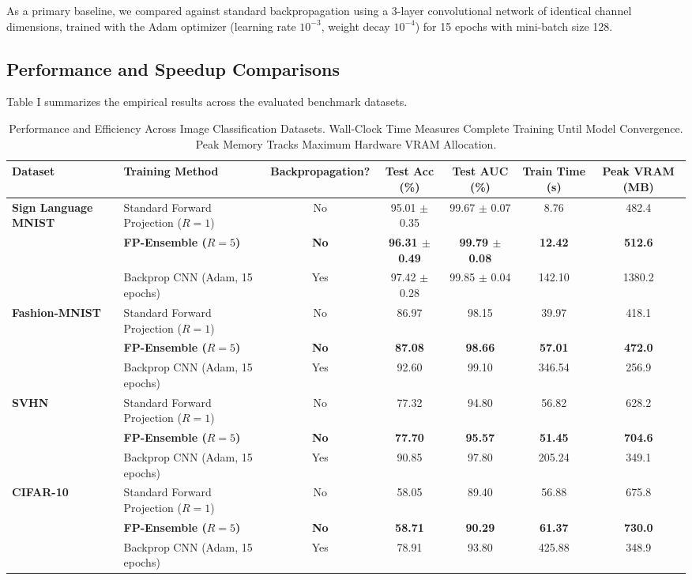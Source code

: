 \documentclass[journal]{IEEEtran}
\begin{document}
As a primary baseline, we compared against standard backpropagation using a 3-layer convolutional network of identical channel dimensions, trained with the Adam optimizer (learning rate $10^{-3}$, weight decay $10^{-4}$) for 15 epochs with mini-batch size 128.

\subsection{Performance and Speedup Comparisons}

Table I summarizes the empirical results across the evaluated benchmark datasets.

\begin{table}[t]
\centering
\caption{Performance and Efficiency Across Image Classification Datasets. Wall-Clock Time Measures Complete Training Until Model Convergence. Peak Memory Tracks Maximum Hardware VRAM Allocation.}
\label{tab:main_results}
\begin{tabular}{llccccc}
\toprule
\textbf{Dataset} & \textbf{Training Method} & \textbf{Backpropagation?} & \textbf{Test Acc (\%)} & \textbf{Test AUC (\%)} & \textbf{Train Time (s)} & \textbf{Peak VRAM (MB)} \\
\midrule
\multirow{3}{*}{\textbf{Sign Language MNIST}} 
& Standard Forward Projection ($R=1$) & No  & 95.01 $\pm$ 0.35 & 99.67 $\pm$ 0.07 & 8.76 & 482.4 \\
& \textbf{FP-Ensemble ($R=5$)}         & \textbf{No}  & \textbf{96.31 $\pm$ 0.49} & \textbf{99.79 $\pm$ 0.08} & \textbf{12.42} & \textbf{512.6} \\
& Backprop CNN (Adam, 15 epochs)       & Yes & 97.42 $\pm$ 0.28 & 99.85 $\pm$ 0.04 & 142.10 & 1380.2 \\
\midrule
\multirow{3}{*}{\textbf{Fashion-MNIST}} 
& Standard Forward Projection ($R=1$) & No  & 86.97 & 98.15 & 39.97 & 418.1 \\
& \textbf{FP-Ensemble ($R=5$)}         & \textbf{No}  & \textbf{87.08} & \textbf{98.66} & \textbf{57.01} & \textbf{472.0} \\
& Backprop CNN (Adam, 15 epochs)       & Yes & 92.60 & 99.10 & 346.54 & 256.9 \\
\midrule
\multirow{3}{*}{\textbf{SVHN}} 
& Standard Forward Projection ($R=1$) & No  & 77.32 & 94.80 & 56.82 & 628.2 \\
& \textbf{FP-Ensemble ($R=5$)}         & \textbf{No}  & \textbf{77.70} & \textbf{95.57} & \textbf{51.45} & \textbf{704.6} \\
& Backprop CNN (Adam, 15 epochs)       & Yes & 90.85 & 97.80 & 205.24 & 349.1 \\
\midrule
\multirow{3}{*}{\textbf{CIFAR-10}} 
& Standard Forward Projection ($R=1$) & No  & 58.05 & 89.40 & 56.88 & 675.8 \\
& \textbf{FP-Ensemble ($R=5$)}         & \textbf{No}  & \textbf{58.71} & \textbf{90.29} & \textbf{61.37} & \textbf{730.0} \\
& Backprop CNN (Adam, 15 epochs)       & Yes & 78.91 & 93.80 & 425.88 & 348.9 \\
\bottomrule
\end{tabular}
\end{table}
\end{document}
